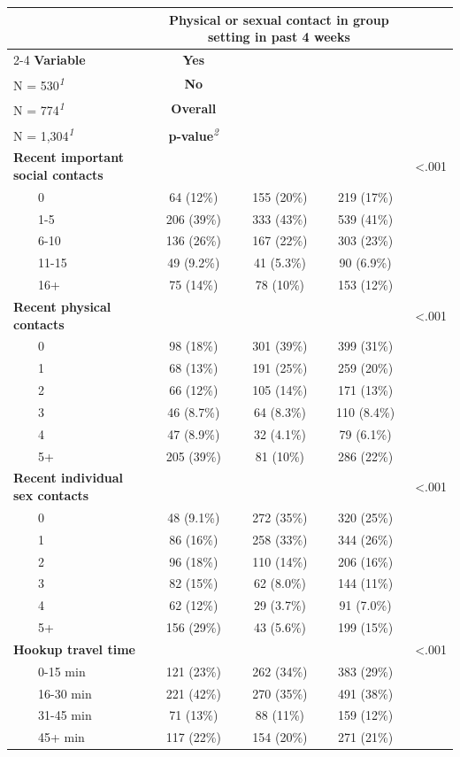 \documentclass[
  letterpaper,
  DIV=11,
  numbers=noendperiod,
  oneside]{scrreprt}
\begin{document}
\begin{longtable}{lcccc}
\toprule
 & \multicolumn{3}{c}{\textbf{Physical or sexual contact in group setting in past 4 weeks}} &  \\ 
\cmidrule(lr){2-4}
\textbf{Variable} & \textbf{Yes}\\
N = 530\textsuperscript{\textit{1}} & \textbf{No}\\
N = 774\textsuperscript{\textit{1}} & \textbf{Overall}\\
N = 1,304\textsuperscript{\textit{1}} & \textbf{p-value}\textsuperscript{\textit{2}} \\ 
\midrule\addlinespace[2.5pt]
\textbf{Recent important social contacts} &  &  &  & <.001 \\ 
    0 & 64 (12\%) & 155 (20\%) & 219 (17\%) &  \\ 
    1-5 & 206 (39\%) & 333 (43\%) & 539 (41\%) &  \\ 
    6-10 & 136 (26\%) & 167 (22\%) & 303 (23\%) &  \\ 
    11-15 & 49 (9.2\%) & 41 (5.3\%) & 90 (6.9\%) &  \\ 
    16+ & 75 (14\%) & 78 (10\%) & 153 (12\%) &  \\ 
\textbf{Recent physical contacts} &  &  &  & <.001 \\ 
    0 & 98 (18\%) & 301 (39\%) & 399 (31\%) &  \\ 
    1 & 68 (13\%) & 191 (25\%) & 259 (20\%) &  \\ 
    2 & 66 (12\%) & 105 (14\%) & 171 (13\%) &  \\ 
    3 & 46 (8.7\%) & 64 (8.3\%) & 110 (8.4\%) &  \\ 
    4 & 47 (8.9\%) & 32 (4.1\%) & 79 (6.1\%) &  \\ 
    5+ & 205 (39\%) & 81 (10\%) & 286 (22\%) &  \\ 
\textbf{Recent individual sex contacts} &  &  &  & <.001 \\ 
    0 & 48 (9.1\%) & 272 (35\%) & 320 (25\%) &  \\ 
    1 & 86 (16\%) & 258 (33\%) & 344 (26\%) &  \\ 
    2 & 96 (18\%) & 110 (14\%) & 206 (16\%) &  \\ 
    3 & 82 (15\%) & 62 (8.0\%) & 144 (11\%) &  \\ 
    4 & 62 (12\%) & 29 (3.7\%) & 91 (7.0\%) &  \\ 
    5+ & 156 (29\%) & 43 (5.6\%) & 199 (15\%) &  \\ 
\textbf{Hookup travel time} &  &  &  & <.001 \\ 
    0-15 min & 121 (23\%) & 262 (34\%) & 383 (29\%) &  \\ 
    16-30 min & 221 (42\%) & 270 (35\%) & 491 (38\%) &  \\ 
    31-45 min & 71 (13\%) & 88 (11\%) & 159 (12\%) &  \\ 
    45+ min & 117 (22\%) & 154 (20\%) & 271 (21\%) &  \\ 
\bottomrule
\end{longtable}
\end{document}
